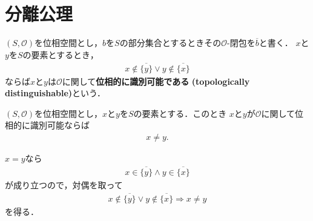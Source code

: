 \section{分離公理}
	\begin{screen}
		\begin{dfn}[位相的に識別可能]
			$(S,\mathscr{O})$を位相空間とし，$b$を$S$の部分集合とするときその$\mathscr{O}$-閉包を$\overline{b}$と書く．
			$x$と$y$を$S$の要素とするとき，
			\begin{align}
				x \notin \overline{\{y\}} \vee y \notin \overline{\{x\}}
			\end{align}
			ならば$x$と$y$は$\mathscr{O}$に関して{\bf 位相的に識別可能である}
			{\bf (topologically distinguishable)}という．
		\end{dfn}
	\end{screen}
	
	\begin{screen}
		\begin{thm}[位相的に識別可能な二点は相異なる]
			$(S,\mathscr{O})$を位相空間とし，$x$と$y$を$S$の要素とする．このとき
			$x$と$y$が$\mathscr{O}$に関して位相的に識別可能ならば
			\begin{align}
				x \neq y.
			\end{align}
		\end{thm}
	\end{screen}
	
	\begin{prf}
		$x = y$なら
		\begin{align}
			x \in \overline{\{y\}} \wedge y \in \overline{\{x\}}
		\end{align}
		が成り立つので，対偶を取って
		\begin{align}
			x \notin \overline{\{y\}} \vee y \notin \overline{\{x\}} \Longrightarrow x \neq y
		\end{align}
		を得る．
		\QED
	\end{prf}
	
